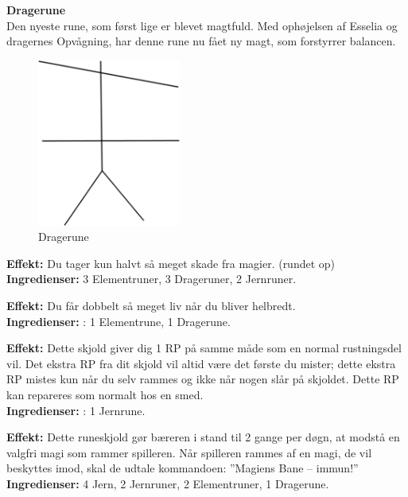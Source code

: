 \textbf{Dragerune}\\
Den nyeste rune, som først lige er blevet magtfuld. Med ophøjelsen af Esselia og dragernes Opvågning, har denne rune nu fået ny magt, som forstyrrer balancen.\\
\begin{figure}[H]
    \centering
    \includegraphics[height=5.5cm]{setup/Pictures/Dragerune.png}
    \caption{Dragerune}
\end{figure}

\begin{runeskjold*}[Drageskind]
\textbf{Effekt:} Du tager kun halvt så meget skade fra magier. (rundet op)\\
\textbf{Ingredienser:} 3 Elementruner, 3 Drageruner, 2 Jernruner.
\end{runeskjold*}

\begin{runeskjold*}
\textbf{Effekt:} Du får dobbelt så meget liv når du bliver helbredt.\\
\textbf{Ingredienser:} : 1 Elementrune, 1 Dragerune.
\end{runeskjold*}

\begin{runeskjold*}
\textbf{Effekt:} Dette skjold giver dig 1 RP på samme måde som en normal rustningsdel vil. Det ekstra RP fra dit skjold vil altid være det første du mister; dette ekstra RP mistes kun når du selv rammes og ikke når nogen slår på skjoldet. Dette RP kan repareres som normalt hos en smed.\\
\textbf{Ingredienser:} : 1 Jernrune.
\end{runeskjold*}

\begin{runeskjold*}
\textbf{Effekt:} Dette runeskjold gør bæreren i stand til 2 gange per døgn, at modstå en valgfri magi som rammer spilleren. Når spilleren rammes af en magi, de vil beskyttes imod, skal de udtale kommandoen: ”Magiens Bane – immun!”\\
\textbf{Ingredienser:} 4 Jern, 2 Jernruner, 2 Elementruner, 1 Dragerune.
\end{runeskjold*}

